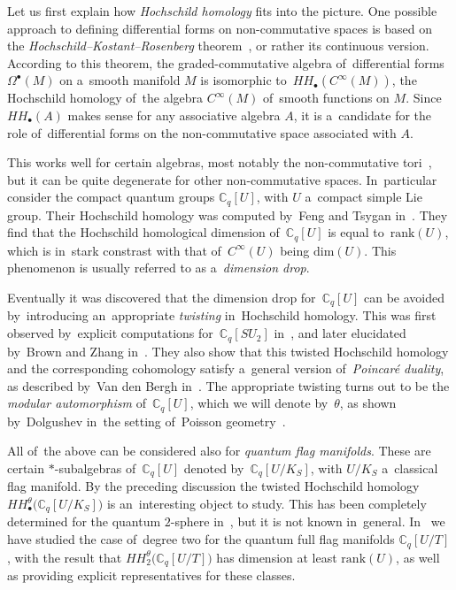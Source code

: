 \documentclass[pdftex]{sigma}
\numberwithin{equation}{section}
\newcommand{\CqU}{\mathbb{C}_q[U]}
\newcommand{\Cqflag}{\mathbb{C}_q[U / K_S]}
\newcommand{\Cqfullflag}{\mathbb{C}_q[U /T]}
\newcommand{\bbC}{\mathbb{C}}
\begin{document}
Let us first explain how \emph{Hoch\-schild homology} fits into the picture.
One possible approach to defining differential forms on non-commutative spaces is based on the \emph{Hoch\-schild--Kostant--Rosenberg} theorem~\cite{hkr}, or rather its continuous version. According to this theorem, the graded-commutative algebra of~differential forms $\Omega^\bullet(M)$ on a~smooth manifold $M$ is isomorphic to~$HH_\bullet(C^\infty(M))$, the Hoch\-schild homology of~the algebra $C^\infty(M)$ of~smooth functions on $M$.
Since $HH_\bullet(A)$ makes sense for any associative algebra $A$, it is a~candidate
for the role of~differential forms on the non-commutative space associated with $A$.

This works well for certain algebras, most notably the non-commutative tori~\cite{connes}, but it can be quite degenerate for other non-commutative spaces.
In~particular consider the compact quantum groups $\CqU$, with $U$ a~compact simple Lie group.
Their Hoch\-schild homology was computed by~Feng and Tsygan in~\cite{feng-tsygan}.
They find that the Hoch\-schild homological dimension of~$\CqU$ is equal to~$\mathrm{rank}(U)$, which is in~stark constrast with that of~$C^\infty(U)$ being $\mathrm{dim}(U)$.
This phenomenon is usually referred to as a~\emph{dimension drop}.

Eventually it was discovered that the dimension drop for~$\CqU$ can be avoided by~introducing an~appropriate \emph{twisting} in~Hoch\-schild homology.
This was first observed by~explicit computations for~$\bbC_q[SU_2]$ in~\cite{twisted-su2}, and later elucidated by~Brown and Zhang in~\cite{brzh}.
They also show that this twisted Hoch\-schild homology and the corresponding cohomology satisfy a~general version of~\emph{Poincaré duality}, as described by~Van den Bergh in~\cite{vandenbergh}.
The appropriate twisting turns out to be the \emph{modular automorphism} of~$\CqU$, which we will denote by~$\theta$, as shown by~Dolgushev in~the setting of~Poisson geometry~\cite{dolgushev}.

All of~the above can be considered also for \emph{quantum flag manifolds}.
These are certain $*$-sub\-algebras of~$\CqU$ denoted by~$\Cqflag$, with $U / K_S$ a~classical flag manifold.
By the preceding discussion the twisted Hoch\-schild homology $HH^\theta_\bullet\big(\Cqflag\big)$ is an~interesting object to study.
This has been completely determined for the quantum $2$-sphere in~\cite{hadfield}, but it is not known in~general.
In~\cite{twist-hoch} we have studied the case of~degree two for the quantum full flag manifolds $\Cqfullflag$, with the result that $HH^\theta_2\big(\Cqfullflag\big)$ has dimension at least $\mathrm{rank}(U)$, as well as providing explicit representatives for these classes.
\end{document}
